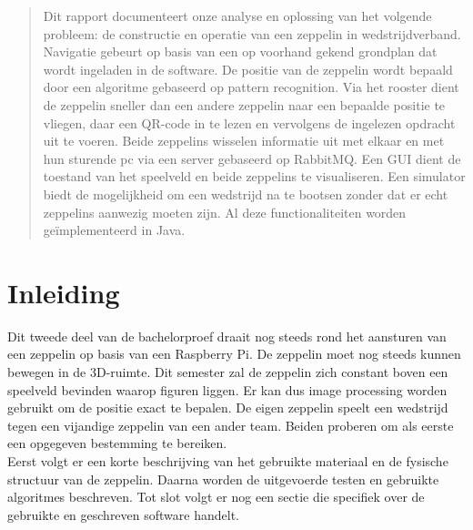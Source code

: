 \documentclass[eind]{penoverslag}
\begin{document}
\maketitlepage


\begin{abstract}
Dit rapport documenteert onze analyse en oplossing van het volgende probleem: de constructie en operatie van een zeppelin in wedstrijdverband. Navigatie gebeurt op basis van een op voorhand gekend grondplan dat wordt ingeladen in de software. De positie van de zeppelin wordt bepaald door een algoritme gebaseerd op pattern recognition. Via het rooster dient de zeppelin sneller dan een andere zeppelin naar een bepaalde positie te vliegen, daar een QR-code in te lezen en vervolgens de ingelezen opdracht uit te voeren. Beide zeppelins wisselen informatie uit met elkaar en met hun sturende pc via een server gebaseerd op RabbitMQ. Een GUI dient de toestand van het speelveld en beide zeppelins te visualiseren. Een simulator biedt de mogelijkheid om een wedstrijd na te bootsen zonder dat er echt zeppelins aanwezig moeten zijn. Al deze functionaliteiten worden ge\"{i}mplementeerd in Java.\\
\end{abstract}


\tableofcontents\newpage


\section{Inleiding}
Dit tweede deel van de bachelorproef draait nog steeds rond het aansturen van een zeppelin op basis van een Raspberry Pi. De zeppelin moet nog steeds kunnen bewegen in de 3D-ruimte. Dit semester zal de zeppelin zich constant boven een speelveld bevinden waarop figuren liggen. Er kan dus image processing worden gebruikt om de positie exact te bepalen. De eigen zeppelin speelt een wedstrijd tegen een vijandige zeppelin van een ander team. Beiden proberen om als eerste een opgegeven bestemming te bereiken.\\
Eerst volgt er een korte beschrijving van het gebruikte materiaal en de fysische structuur van de zeppelin. Daarna worden de uitgevoerde testen en gebruikte algoritmes beschreven. Tot slot volgt er nog een sectie die specifiek over de gebruikte en geschreven software handelt. 
\end{document}
